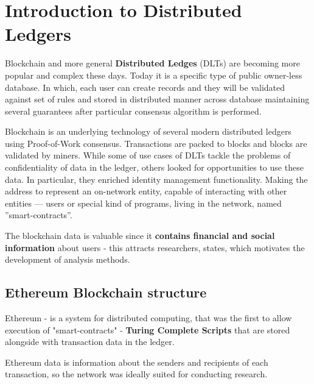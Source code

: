 \Introduction

\section{Introduction to Distributed Ledgers}
Blockchain and more general \textbf{Distributed Ledges} (DLTs) are becoming more popular and complex these days. Today it is a specific type of public owner-less database. In which, each user can create records and they will be validated against set of rules and stored in distributed manner across database maintaining several guarantees after particular consensus algorithm is performed.

Blockchain is an underlying technology of several modern distributed ledgers using Proof-of-Work consensus. Transactions are packed to blocks and blocks are validated by miners. While some of use cases of DLTs tackle the problems of confidentiality of data in the ledger, others looked for opportunities to use these data. In particular, they enriched identity management functionality. Making the address to represent an on-network entity, capable of interacting with other entities — users or special kind of programs, living in the network, named ”smart-contracts”.

The blockchain data is valuable since it \textbf{contains financial and social information} about users - this attracts researchers, states, which motivates the development of analysis methods.

\subsection{Ethereum Blockchain structure}
Ethereum - is a system for distributed computing, that was the first to allow execution of "smart-contracts" - \textbf{Turing Complete Scripts} that are stored alongside with transaction data in the ledger. 

Ethereum data is information about the senders and recipients of each transaction, so the network was ideally suited for conducting research. %
\\

